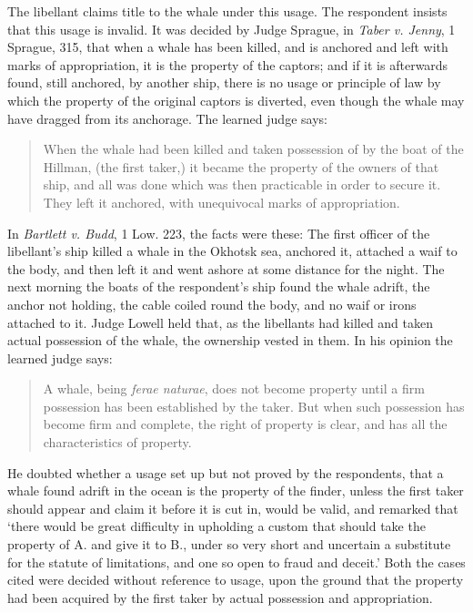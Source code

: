 The libellant claims title to the whale under this usage. The respondent insists
that this usage is invalid. It was decided by Judge Sprague, in \emph{Taber v.
Jenny}, 1 Sprague, 315, that when a whale has been killed, and is anchored and
left with marks of appropriation, it is the property of the captors; and if it
is afterwards found, still anchored, by another ship, there is no usage or
principle of law by which the property of the original captors is diverted, even
though the whale may have dragged from its anchorage. The learned judge says:
\begin{quote}
When the whale had been killed and taken possession of by the boat of the
Hillman, (the first taker,) it became the property of the owners of that ship,
and all was done which was then practicable in order to secure it. They left it
anchored, with unequivocal marks of appropriation.
\end{quote}

In \emph{Bartlett v. Budd}, 1 Low. 223, the facts were these: The first officer
of the libellant's ship killed a whale in the Okhotsk sea, anchored it, attached
a waif to the body, and then left it and went
ashore at some distance for the night. The next morning the boats of the
respondent's ship found the whale adrift, the anchor not holding, the cable
coiled round the body, and no waif or irons attached to it. Judge Lowell held
that, as the libellants had killed and taken actual possession of the whale, the
ownership vested in them. In his opinion the learned judge says:
\begin{quote}
A whale, being \textit{ferae naturae}, does not become property until a firm
possession has been established by the taker. But when such possession has
become firm and complete, the right of property is clear, and has all the
characteristics of property.
\end{quote}

He doubted whether a usage set up but not proved by the respondents, that a
whale found adrift in the ocean is the property of the finder, unless the first
taker should appear and claim it before it is cut in, would be valid, and
remarked that `there would be great difficulty in upholding a custom that should
take the property of A. and give it to B., under so very short and uncertain a
substitute for the statute of limitations, and one so open to fraud and deceit.'
Both the cases cited were decided without reference to usage, upon the ground
that the property had been acquired by the first taker by actual possession and
appropriation.

